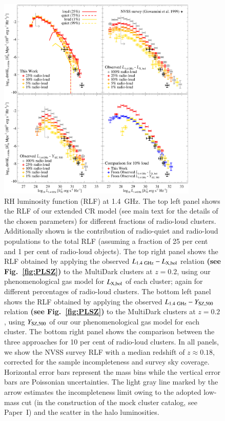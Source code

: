 \documentclass[useAMS,usenatbib]{mn2e}
\begin{document}
\begin{figure} 
\centering
\includegraphics[width=0.85\textwidth]{figures/RLFs_1.4.eps}
\caption{RH luminosity function (RLF) at 1.4~GHz. The top left panel shows the
  RLF of our extended CR model (see main text for the details of the chosen
  parameters) for different fractions of radio-loud clusters. Additionally shown
  is the contribution of radio-quiet and radio-loud populations to the total RLF
  (assuming a fraction of 25 per cent and 1 per cent of radio-loud objects). The
  top right panel shows the RLF obtained by applying the observed
  $L_{1.4~{\mathrm{GHz}}}-L_{{\mathrm{X,bol}}}$ relation {\bf (see Fig.~\ref{fig:PLSZ})}
  to the MultiDark clusters at $z = 0.2$, using our phenomenological gas model
  for $L_{{\mathrm{X,bol}}}$ of each cluster; again for different percentages of
  radio-loud clusters.  The bottom left panel shows the RLF obtained by applying
  the observed $L_{1.4~{\mathrm{GHz}}}-Y_{{\mathrm{SZ}}, 500}$ relation {\bf (see
    Fig.~\ref{fig:PLSZ})} to the MultiDark clusters at $z = 0.2$, using
  $Y_{{\mathrm{SZ}}, 500}$ of our our phenomenological gas model for each
  cluster. The bottom right panel shows the comparison between the three
  approaches for 10 per cent of radio-loud clusters. In all panels, we show the
  NVSS survey RLF \citep{1999NewA....4..141G} with a median redshift of
  $z\approx 0.18$, corrected for the sample incompleteness and survey sky
  coverage.  Horizontal error bars represent the mass bins while the vertical
  error bars are Poissonian uncertainties. The light gray line marked by the
  arrow estimates the incompleteness limit owing to the adopted low-mass cut (in
  the construction of the mock cluster catalog, see Paper~I) and the scatter in
  the halo luminosities.}
\label{fig:RLF_1.4}
\end{figure}
\end{document}
